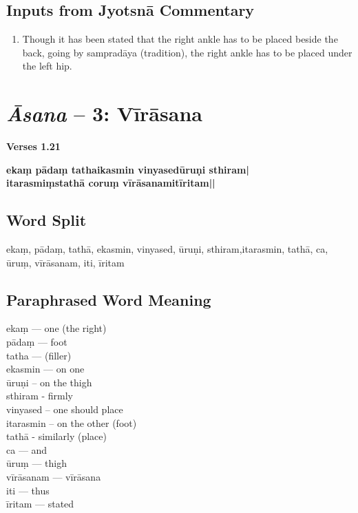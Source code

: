\subsection*{Inputs from Jyotsnā Commentary}

\begin{enumerate}
\item Though it has been stated that the right ankle has to be placed beside the back, going by sampradāya (tradition), the right ankle has to be placed under the left hip.
\end{enumerate}
\newpage

\section*{\textit{Āsana} -- 3: Vīrāsana}

\noindent \textbf{Verses 1.21}

\begin{shloka}
\textbf{ekaṃ pādaṃ tathaikasmin vinyasedūruṇi sthiram|}\\
\textbf{itarasmiṃstathā coruṃ vīrāsanamitīritam||}
\end{shloka}

\subsection*{Word Split}

ekaṃ, pādaṃ,  tathā, ekasmin, vinyased, ūruṇi, sthiram,itarasmin, tathā, ca, ūruṃ, vīrāsanam, iti, īritam

\subsection*{Paraphrased Word Meaning}

\begin{multicols}{2}
ekaṃ --- one (the right)\\
pādaṃ --- foot\\ 
tatha --- (filler)\\  
ekasmin --- on one\\ 
ūruṇi – on the thigh\\ 
sthiram - firmly\\  
vinyased – one should place\\
itarasmin – on the other (foot)\\
tathā  - similarly (place)\\
ca --- and\\
ūruṃ --- thigh\\
vīrāsanam --- vīrāsana\\
iti --- thus\\
īritam --- stated
\end{multicols}

